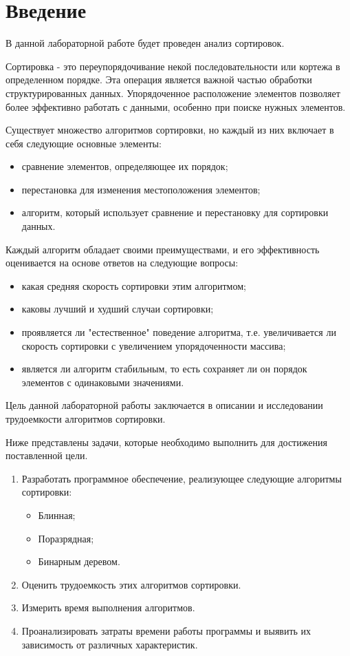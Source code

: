 \chapter*{Введение}

В данной лабораторной работе будет проведен анализ сортировок.

Сортировка - это переупорядочивание некой последовательности или кортежа в определенном порядке. 
Эта операция является важной частью обработки структурированных данных. 
Упорядоченное расположение элементов позволяет более эффективно работать с данными, особенно при поиске нужных элементов.

Существует множество алгоритмов сортировки, но каждый из них включает в себя следующие основные элементы:
\begin{itemize}
\item сравнение элементов, определяющее их порядок;
\item перестановка для изменения местоположения элементов;
\item алгоритм, который использует сравнение и перестановку для сортировки данных.
\end{itemize}

Каждый алгоритм обладает своими преимуществами, и его эффективность оценивается на основе ответов на следующие вопросы:
\begin{itemize}
\item какая средняя скорость сортировки этим алгоритмом;
\item каковы лучший и худший случаи сортировки;
\item проявляется ли "естественное" поведение алгоритма, т.е. увеличивается ли скорость сортировки с увеличением упорядоченности массива;
\item является ли алгоритм стабильным, то есть сохраняет ли он порядок элементов с одинаковыми значениями.
\end{itemize}

Цель данной лабораторной работы заключается в описании и исследовании трудоемкости алгоритмов сортировки.

Ниже представлены задачи, которые необходимо выполнить для достижения поставленной цели.
\begin{enumerate}
\item Разработать программное обеспечение, реализующее следующие алгоритмы сортировки:
\begin{itemize}
\item Блинная;
\item Поразрядная;
\item Бинарным деревом.
\end{itemize}
\item Оценить трудоемкость этих алгоритмов сортировки.
\item Измерить время выполнения алгоритмов.
\item Проанализировать затраты времени работы программы и выявить их зависимость от различных характеристик.
\end{enumerate}
